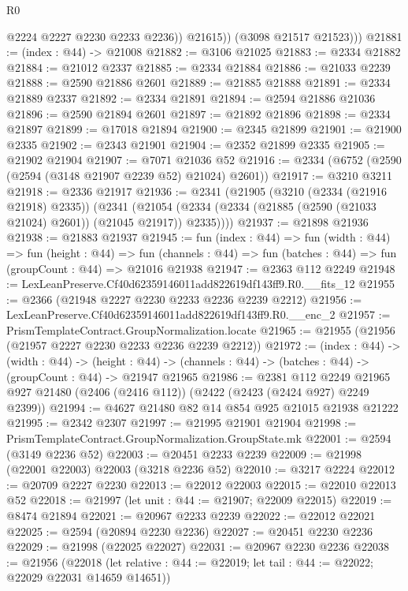 \begin{lexlean}{R0}
\begin{coremodule}
                @2224
                @2227
                @2230
                @2233
                @2236))
            @21615))
        (@3098 @21517 @21523)))
@21881 := (index : @44) -> @21008
@21882 := @3106 @21025
@21883 := @2334 @21882
@21884 := @21012 @2337
@21885 := @2334 @21884
@21886 := @21033 @2239
@21888 := @2590 @21886 @2601
@21889 := @21885 @21888
@21891 := @2334 @21889 @2337
@21892 := @2334 @21891
@21894 := @2594 @21886 @21036
@21896 := @2590 @21894 @2601
@21897 := @21892 @21896
@21898 := @2334 @21897
@21899 := @17018 @21894
@21900 := @2345 @21899
@21901 := @21900 @2335
@21902 := @2343 @21901
@21904 := @2352 @21899 @2335
@21905 := @21902 @21904
@21907 := @7071 @21036 @52
@21916 := @2334 (@6752 (@2590 (@2594 (@3148 @21907 @2239 @52) @21024) @2601))
@21917 := @3210 @3211
@21918 := @2336 @21917
@21936 := @2341
    (@21905
      (@3210 (@2334 (@21916 @21918) @2335))
      (@2341 (@21054 (@2334 (@2334 (@21885 (@2590 (@21033 @21024) @2601)) (@21045 @21917)) @2335))))
@21937 := @21898 @21936
@21938 := @21883 @21937
@21945 := fun (index : @44) =>
  fun (width : @44) =>
  fun (height : @44) =>
  fun (channels : @44) => fun (batches : @44) => fun (groupCount : @44) => @21016 @21938
@21947 := @2363 @112 @2249
@21948 := LexLeanPreserve.Cf40d62359146011add822619df143ff9.R0.__fits_12
@21955 := @2366 (@21948 @2227 @2230 @2233 @2236 @2239 @2212)
@21956 := LexLeanPreserve.Cf40d62359146011add822619df143ff9.R0.__enc_2
@21957 := PrismTemplateContract.GroupNormalization.locate
@21965 := @21955 (@21956 (@21957 @2227 @2230 @2233 @2236 @2239 @2212))
@21972 := (index : @44) ->
  (width : @44) ->
  (height : @44) -> (channels : @44) -> (batches : @44) -> (groupCount : @44) -> @21947 @21965
@21986 := @2381
    @112
    @2249
    @21965
    @927
    @21480
    (@2406 (@2416 @112))
    (@2422 (@2423 (@2424 @927) @2249 @2399))
@21994 := @4627 @21480 @82 @14 @854 @925 @21015 @21938 @21222
@21995 := @2342 @2307
@21997 := @21995 @21901 @21904
@21998 := PrismTemplateContract.GroupNormalization.GroupState.mk
@22001 := @2594 (@3149 @2236 @52)
@22003 := @20451 @2233 @2239
@22009 := @21998 (@22001 @22003) @22003 (@3218 @2236 @52)
@22010 := @3217 @2224
@22012 := @20709 @2227 @2230
@22013 := @22012 @22003
@22015 := @22010 @22013 @52
@22018 := @21997 (let unit : @44 := @21907; @22009 @22015)
@22019 := @8474 @21894
@22021 := @20967 @2233 @2239
@22022 := @22012 @22021
@22025 := @2594 (@20894 @2230 @2236)
@22027 := @20451 @2230 @2236
@22029 := @21998 (@22025 @22027)
@22031 := @20967 @2230 @2236
@22038 := @21956
    (@22018 (let relative : @44 := @22019; let tail : @44 := @22022; @22029 @22031 @14659 @14651))

\end{coremodule}
\end{lexlean}
